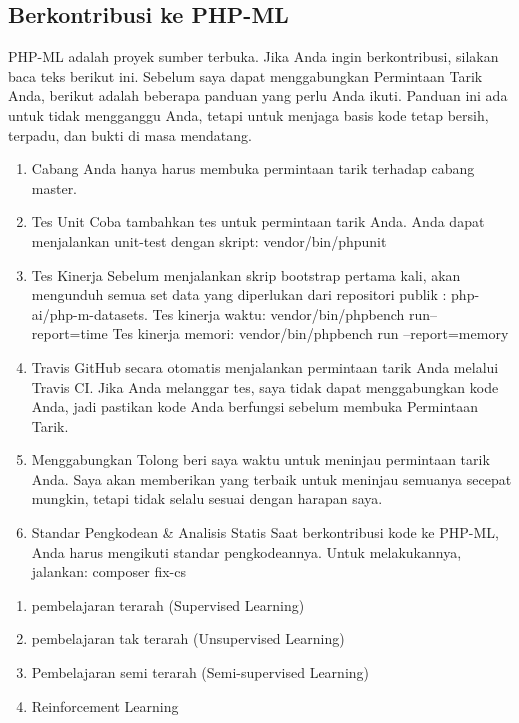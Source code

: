 \subsection{Berkontribusi ke PHP-ML}
\par PHP-ML adalah proyek sumber terbuka. Jika Anda ingin berkontribusi, silakan baca teks berikut ini. Sebelum saya dapat menggabungkan Permintaan Tarik Anda, berikut adalah beberapa panduan yang perlu Anda ikuti. Panduan ini ada untuk tidak mengganggu Anda, tetapi untuk menjaga basis kode tetap bersih, terpadu, dan bukti di masa mendatang.
\begin{enumerate}
\item Cabang
Anda hanya harus membuka permintaan tarik terhadap cabang master.
\item Tes Unit
Coba tambahkan tes untuk permintaan tarik Anda. Anda dapat menjalankan unit-test dengan skript:
	vendor/bin/phpunit
\item Tes Kinerja
Sebelum menjalankan skrip bootstrap pertama kali, akan mengunduh semua set data yang diperlukan dari repositori publik : php-ai/php-m-datasets.
Tes kinerja waktu:
vendor/bin/phpbench run--report=time
Tes kinerja memori:
vendor/bin/phpbench run --report=memory
\item Travis
GitHub secara otomatis menjalankan permintaan tarik Anda melalui Travis CI. Jika Anda melanggar tes, saya tidak dapat menggabungkan kode Anda, jadi pastikan kode Anda berfungsi sebelum membuka Permintaan Tarik.
\item Menggabungkan
Tolong beri saya waktu untuk meninjau permintaan tarik Anda. Saya akan memberikan yang terbaik untuk meninjau semuanya secepat mungkin, tetapi tidak selalu sesuai dengan harapan saya.
\item Standar Pengkodean \& Analisis Statis
Saat berkontribusi kode ke PHP-ML, Anda harus mengikuti standar pengkodeannya. Untuk melakukannya, jalankan:
	composer fix-cs
\end{enumerate}





















\begin{enumerate}
	\item pembelajaran terarah (Supervised Learning)
	\item pembelajaran tak terarah (Unsupervised Learning)
	\item Pembelajaran semi terarah (Semi-supervised Learning)
	\item Reinforcement Learning
\end{enumerate}

